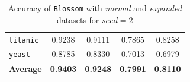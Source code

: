 \documentclass[12pt]{report}
\theoremstyle{definition}
\theoremstyle{definition}
\theoremstyle{definition}
\begin{document}
\begin{table}[ht]
\begin{tabular}{lcccc}
    \multicolumn{1}{l}{\tt titanic}       & \multicolumn{1}{c}{0.9238} & \multicolumn{1}{c}{0.9111} & \multicolumn{1}{c}{0.7865} & \multicolumn{1}{c}{0.8258} \\
    \multicolumn{1}{l}{\tt yeast}         & \multicolumn{1}{c}{0.8785} & \multicolumn{1}{c}{0.8330} & \multicolumn{1}{c}{0.7013} & \multicolumn{1}{c}{0.6979} \\
    \hline
    \multicolumn{1}{l}{\bf Average}       & \multicolumn{1}{c}{\bf 0.9403} & \multicolumn{1}{c}{\bf 0.9248} & \multicolumn{1}{c}{\bf 0.7991} & \multicolumn{1}{c}{\bf 0.8110} \\
    \hline
    \end{tabular}
    \caption{Accuracy of \texttt{Blossom} with \textit{normal} and \textit{expanded} datasets for $seed=2$}
    \label{fig:seed2}
\end{table}
\end{document}
